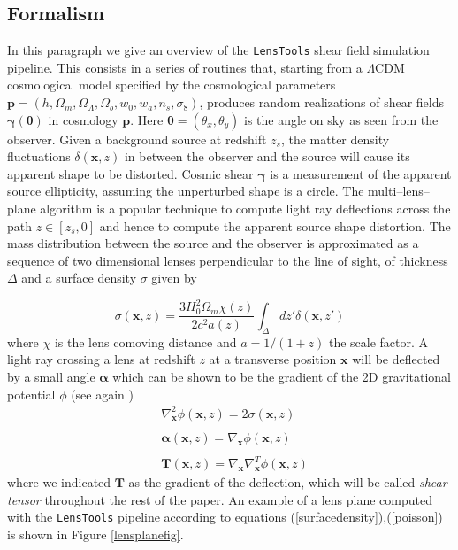 \documentclass[reprint,aps,prd,superscriptaddress,showkeys,showpacs]{revtex4-1}
\newcommand{\bb}[1]{\mathbf{#1}}
\newcommand{\LT}{\texttt{LensTools} }
\begin{document}
\subsection{Formalism}
%
In this paragraph we give an overview of the \LT shear field simulation pipeline. This consists in a series of routines that, starting from a $\Lambda$CDM cosmological model specified by the cosmological parameters $\bb{p}=(h,\Omega_m,\Omega_\Lambda,\Omega_b,w_0,w_a,n_s,\sigma_8)$, produces random realizations of shear fields $\pmb{\gamma}(\pmb{\theta})$ in cosmology $\bb{p}$. Here $\pmb{\theta}=(\theta_x,\theta_y)$ is the angle on sky as seen from the observer. Given a background source at redshift $z_s$, the matter density fluctuations $\delta(\bb{x},z)$ in between the observer and the source will cause its apparent shape to be distorted. Cosmic shear $\pmb{\gamma}$ is a measurement of the apparent source ellipticity, assuming the unperturbed shape is a circle. The multi--lens--plane algorithm \citep{RayTracingHartlap} is a popular technique to compute light ray deflections across the path $z\in[z_s,0]$ and hence to compute the apparent source shape distortion. The mass distribution between the source and the observer is approximated as a sequence of two dimensional lenses perpendicular to the line of sight, of thickness $\Delta$ and a surface density $\sigma$ given by 

\begin{equation}
\label{surfacedensity}
\sigma(\bb{x},z) = \frac{3H_0^2\Omega_m\chi(z)}{2c^2a(z)}\int_\Delta dz'\delta(\bb{x},z')
\end{equation}
%
where $\chi$ is the lens comoving distance and $a=1/(1+z)$ the scale factor. A light ray crossing a lens at redshift $z$ at a transverse position $\bb{x}$ will be deflected by a small angle $\pmb{\alpha}$ which can be shown to be the gradient of the 2D gravitational potential $\phi$ (see again \citep{RayTracingHartlap}) 
%
\begin{equation}
\label{poisson}
\begin{matrix}
& \nabla^2_\bb{x} \phi(\bb{x},z) = 2\sigma(\bb{x},z) \\ \\
& \pmb{\alpha}(\bb{x},z) = \nabla_\bb{x} \phi(\bb{x},z) \\ \\
& \bb{T}(\bb{x},z) = \nabla_\bb{x}\nabla_\bb{x}^T \phi(\bb{x},z)
\end{matrix}
\end{equation}
%
where we indicated $\bb{T}$ as the gradient of the deflection, which will be called \textit{shear tensor} throughout the rest of the paper. An example of a lens plane computed with the \LT pipeline according to equations (\ref{surfacedensity}),(\ref{poisson}) is shown in Figure \ref{lensplanefig}. 
\end{document}
